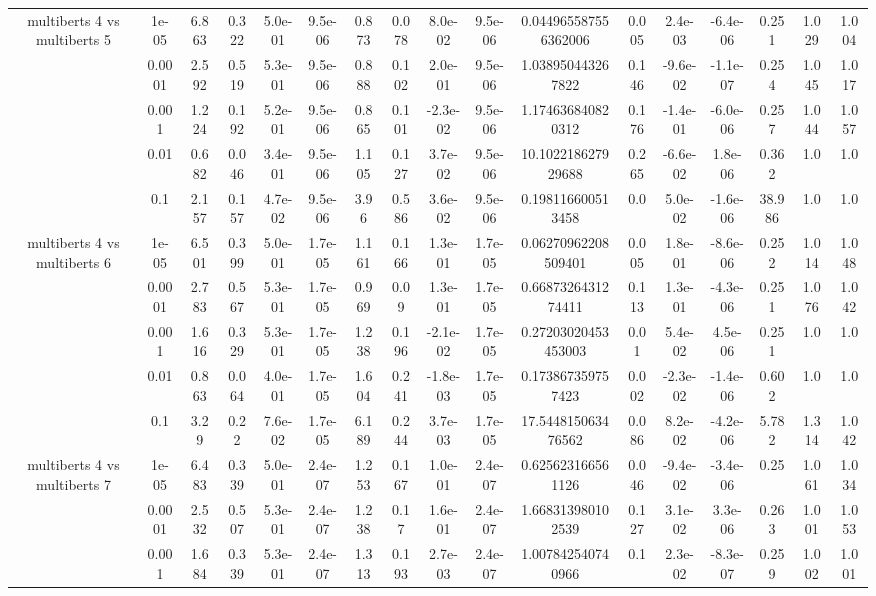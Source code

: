\begin{tabular}{|c|c|c|c|c|c|c|c|c|c|c|c|c|c|c|c|c|}
\hline
\multirow{5}{*}{multiberts 4 vs multiberts 5} & 1e-05 & 6.863 & 0.322 & 5.0e-01 & 9.5e-06 & 0.873 & 0.078 & 8.0e-02 & 9.5e-06 & 0.044965587556362006 & 0.005 & 2.4e-03 & -6.4e-06 & 0.251 & 1.029 & 1.004 \\
 & 0.0001 & 2.592 & 0.519 & 5.3e-01 & 9.5e-06 & 0.888 & 0.102 & 2.0e-01 & 9.5e-06 & 1.038950443267822 & 0.146 & -9.6e-02 & -1.1e-07 & 0.254 & 1.045 & 1.017 \\
 & 0.001 & 1.224 & 0.192 & 5.2e-01 & 9.5e-06 & 0.865 & 0.101 & -2.3e-02 & 9.5e-06 & 1.174636840820312 & 0.176 & -1.4e-01 & -6.0e-06 & 0.257 & 1.044 & 1.057 \\
 & 0.01 & 0.682 & 0.046 & 3.4e-01 & 9.5e-06 & 1.105 & 0.127 & 3.7e-02 & 9.5e-06 & 10.102218627929688 & 0.265 & -6.6e-02 & 1.8e-06 & 0.362 & 1.0 & 1.0 \\
 & 0.1 & 2.157 & 0.157 & 4.7e-02 & 9.5e-06 & 3.96 & 0.586 & 3.6e-02 & 9.5e-06 & 0.198116600513458 & 0.0 & 5.0e-02 & -1.6e-06 & 38.986 & 1.0 & 1.0 \\
\hline
\multirow{5}{*}{multiberts 4 vs multiberts 6} & 1e-05 & 6.501 & 0.399 & 5.0e-01 & 1.7e-05 & 1.161 & 0.166 & 1.3e-01 & 1.7e-05 & 0.06270962208509401 & 0.005 & 1.8e-01 & -8.6e-06 & 0.252 & 1.014 & 1.048 \\
 & 0.0001 & 2.783 & 0.567 & 5.3e-01 & 1.7e-05 & 0.969 & 0.09 & 1.3e-01 & 1.7e-05 & 0.6687326431274411 & 0.113 & 1.3e-01 & -4.3e-06 & 0.251 & 1.076 & 1.042 \\
 & 0.001 & 1.616 & 0.329 & 5.3e-01 & 1.7e-05 & 1.238 & 0.196 & -2.1e-02 & 1.7e-05 & 0.27203020453453003 & 0.01 & 5.4e-02 & 4.5e-06 & 0.251 & 1.0 & 1.0 \\
 & 0.01 & 0.863 & 0.064 & 4.0e-01 & 1.7e-05 & 1.604 & 0.241 & -1.8e-03 & 1.7e-05 & 0.173867359757423 & 0.002 & -2.3e-02 & -1.4e-06 & 0.602 & 1.0 & 1.0 \\
 & 0.1 & 3.29 & 0.22 & 7.6e-02 & 1.7e-05 & 6.189 & 0.244 & 3.7e-03 & 1.7e-05 & 17.544815063476562 & 0.086 & 8.2e-02 & -4.2e-06 & 5.782 & 1.314 & 1.042 \\
\hline
\multirow{5}{*}{multiberts 4 vs multiberts 7} & 1e-05 & 6.483 & 0.339 & 5.0e-01 & 2.4e-07 & 1.253 & 0.167 & 1.0e-01 & 2.4e-07 & 0.625623166561126 & 0.046 & -9.4e-02 & -3.4e-06 & 0.25 & 1.061 & 1.034 \\
 & 0.0001 & 2.532 & 0.507 & 5.3e-01 & 2.4e-07 & 1.238 & 0.17 & 1.6e-01 & 2.4e-07 & 1.668313980102539 & 0.127 & 3.1e-02 & 3.3e-06 & 0.263 & 1.001 & 1.053 \\
 & 0.001 & 1.684 & 0.339 & 5.3e-01 & 2.4e-07 & 1.313 & 0.193 & 2.7e-03 & 2.4e-07 & 1.007842540740966 & 0.1 & 2.3e-02 & -8.3e-07 & 0.259 & 1.002 & 1.001 \\

\end{tabular}
